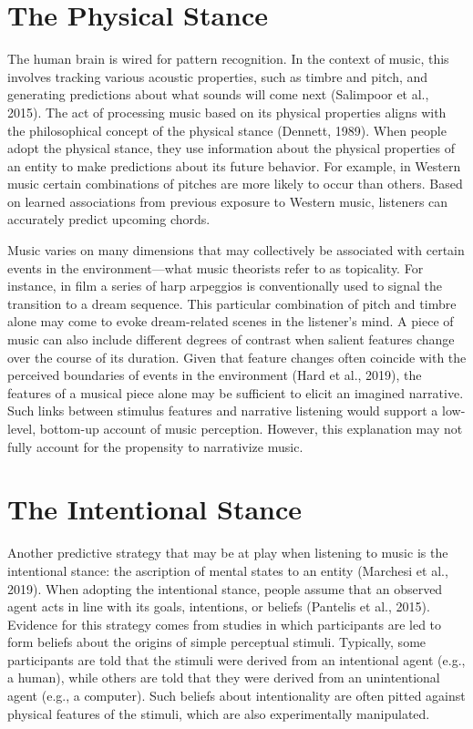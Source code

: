 \documentclass[12pt,twoside]{reedthesis}
\begin{document}
\section{The Physical Stance}
The human brain is wired for pattern recognition. In the context of music, this involves tracking various acoustic properties, such as timbre and pitch, and generating predictions about what sounds will come next (Salimpoor et al., 2015). The act of processing music based on its physical properties aligns with the philosophical concept of the physical stance (Dennett, 1989). When people adopt the physical stance, they use information about the physical properties of an entity to make predictions about its future behavior. For example, in Western music certain combinations of pitches are more likely to occur than others. Based on learned associations from previous exposure to Western music, listeners can accurately predict upcoming chords. 

Music varies on many dimensions that may collectively be associated with certain events in the environment—what music theorists refer to as topicality. For instance, in film a series of harp arpeggios is conventionally used to signal the transition to a dream sequence. This particular combination of pitch and timbre alone may come to evoke dream-related scenes in the listener’s mind. A piece of music can also include different degrees of contrast when salient features change over the course of its duration. Given that feature changes often coincide with the perceived boundaries of events in the environment (Hard et al., 2019), the features of a musical piece alone may be sufficient to elicit an imagined narrative. Such links between stimulus features and narrative listening would support a low-level, bottom-up account of music perception. However, this explanation may not fully account for the propensity to narrativize music. 

\section{The Intentional Stance}
Another predictive strategy that may be at play when listening to music is the intentional stance: the ascription of mental states to an entity (Marchesi et al., 2019). When adopting the intentional stance, people assume that an observed agent acts in line with its goals, intentions, or beliefs (Pantelis et al., 2015). Evidence for this strategy comes from studies in which participants are led to form beliefs about the origins of simple perceptual stimuli. Typically, some participants are told that the stimuli were derived from an intentional agent (e.g., a human), while others are told that they were derived from an unintentional agent (e.g., a computer). Such beliefs about intentionality are often pitted against physical features of the stimuli, which are also experimentally manipulated.
\end{document}

